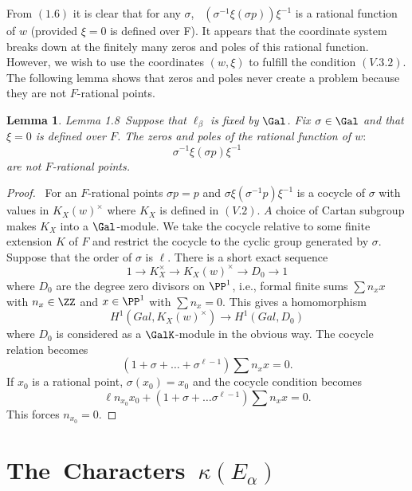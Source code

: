 \documentclass{memo-l}
\newtheorem{lemma}[theorem]{Lemma}
\theoremstyle{definition}
\theoremstyle{remark}
\numberwithin{section}{chapter}
\numberwithin{equation}{chapter}
\begin{document}
{\medskip}

    From $(1.6)$ it is clear that for any ${\sigma}$, \ 
$({\sigma}^{-1}{\xi}({\sigma}p)){\xi}^{-1}$ is a rational function of $w$
(provided ${\xi} = 0$ is defined over F).  It appears that the coordinate
system breaks down at the finitely many zeros and poles of this rational
function.  However, we wish to use the coordinates $(w,{\xi})$ to fulfill
the condition $(V.3.2)$.  The following lemma shows that zeros and poles
never create a problem because they are not $F$-rational points.

\medskip

\begin{lemma}{Lemma 1.8}\ Suppose that ${\ell}_{{\beta}}$ is fixed by
$\Gal$.  Fix ${\sigma}  \in  \Gal$ and that ${\xi} = 0$ is
defined over $F$.  The zeros and poles of the rational function of $w:$
$$
{\sigma}^{-1}{\xi}({\sigma}p){\xi}^{-1}
$$
are not $F$-rational points.
\end{lemma}

\medpagebreak

\begin{proof} \ For an $F$-rational points ${\sigma}p = p$ and
${\sigma}{\xi}({\sigma}^{-1}p){\xi}^{-1}$ is a cocycle of ${\sigma}$ with
values in $K_X(w)^{\times}$ where $K_X$ is defined in $(V.2)$.  $A$ choice of Cartan
subgroup makes $K_X$ into a $\Gal$-module.  We take the cocycle
relative to some finite extension $K$ of $F$ and restrict the cocycle to
the cyclic group generated by ${\sigma}$.  Suppose that the order of
${\sigma}$ is ${\ell}$.  There is a short exact sequence
$$
1 {\to} K_X^{\times} {\to} K_X(w)^{\times} {\to} D_{0} {\to} 1
$$
where $D_{0}$ are the degree zero divisors on ${\PP}^{1}$,  i.e.,  formal
finite sums $\sum n_{x}x$ with $n_{x} \in {\ZZ}$ and $x \in
{\PP}^{1}$ with $\sum n_{x}  =  0$.  This gives a homomorphism
$$H^{1}(Gal,K_X(w)^{\times}) \to H^{1}(Gal,D_{0})$$ where $D_{0}$ is considered as
a $\GalK$-module in the obvious way.  The cocycle relation becomes
$$
(1+{\sigma}+\ldots +{\sigma}^{{\ell}-1})\sum n_{x}x  =  0 .
$$
If $x_{0}$ is a rational point, ${\sigma}(x_{0})  =  x_{0}$ and the cocycle
condition becomes
$$
{\ell}n_{x_0} x_{0} + (1+{\sigma}+\ldots
{\sigma}^{{\ell}-1})\sum n_{x}x  =  0 .
$$
This forces $n_{x_0}  =  0$.
\end{proof} 


\section{The\ Characters\ ${\kappa}(E_\alpha)$}
\end{document}
